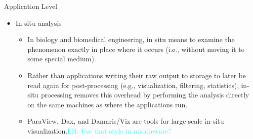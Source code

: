 \documentclass[compress,11pt,xcolor=svgnames,aspectratio=169]{beamer}
\newcommand{\lr}[1]{\textcolor{cyan}{LR: #1}}
\begin{document}
\begin{frame}[fragile]{Application Level}

\begin{itemize}

\item In-situ analysis\\[0.4cm]

    \begin{itemize}
    \setlength\itemsep{0.6cm}

    \item In biology and biomedical engineering, in situ means to examine the phenomenon exactly in place where it occurs (i.e., without moving it to some special medium).

    \item Rather than applications writing their raw output to storage to later be read again for post-processing (e.g., visualization, filtering, statistics), in-situ processing removes this overhead by performing the analysis directly on the same machines as where the applications run.

    \item ParaView, Dax, and Damaris/Viz are tools for large-scale in-situ visualization.\lr{Use that style in middleware?}

    \end{itemize}

\end{itemize}

\nocite{3372390}

\end{frame}
\end{document}
